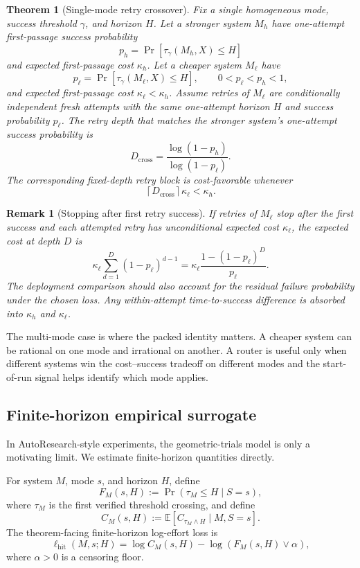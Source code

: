 \documentclass{article}
\newtheorem{theorem}{Theorem}
\newtheorem{remark}{Remark}
\newcommand{\E}{\mathbb{E}}
\begin{document}
\begin{theorem}[Single-mode retry crossover]
\label{thm:crossover}
Fix a single homogeneous mode, success threshold \(\gamma\), and horizon \(H\).
Let a stronger system \(M_h\) have one-attempt first-passage success probability
\[
    p_h=\Pr[\tau_\gamma(M_h,X)\le H]
\]
and expected first-passage cost \(\kappa_h\).  Let a cheaper system \(M_\ell\) have
\[
    p_\ell=\Pr[\tau_\gamma(M_\ell,X)\le H],
    \qquad
    0<p_\ell<p_h<1,
\]
and expected first-passage cost \(\kappa_\ell<\kappa_h\).
Assume retries of \(M_\ell\) are conditionally independent fresh attempts with the same
one-attempt horizon \(H\) and success probability \(p_\ell\).  The retry depth that matches
the stronger system's one-attempt success probability is
\[
    D_{\mathrm{cross}}
    =
    \frac{\log(1-p_h)}{\log(1-p_\ell)}.
\]
The corresponding fixed-depth retry block is cost-favorable whenever
\[
    \left\lceil D_{\mathrm{cross}}\right\rceil\kappa_\ell < \kappa_h .
\]
\end{theorem}

\begin{remark}[Stopping after first retry success]
If retries of \(M_\ell\) stop after the first success and each attempted retry has
unconditional expected cost \(\kappa_\ell\), the expected cost at depth \(D\) is
\[
    \kappa_\ell
    \sum_{d=1}^{D}(1-p_\ell)^{d-1}
    =
    \kappa_\ell\frac{1-(1-p_\ell)^D}{p_\ell}.
\]
The deployment comparison should also account for the residual failure probability under
the chosen loss.  Any within-attempt time-to-success difference is absorbed into
\(\kappa_h\) and \(\kappa_\ell\).
\end{remark}

The multi-mode case is where the packed identity matters.  A cheaper system can be
rational on one mode and irrational on another.  A router is useful only when different
systems win the cost--success tradeoff on different modes and the start-of-run signal helps
identify which mode applies.



\subsection{Finite-horizon empirical surrogate}

In AutoResearch-style experiments, the geometric-trials model is only a motivating limit.
We estimate finite-horizon quantities directly.

For system \(M\), mode \(s\), and horizon \(H\), define
\[
    F_M(s,H):=\Pr(\tau_M\le H\mid S=s),
\]
where \(\tau_M\) is the first verified threshold crossing, and define
\[
    C_M(s,H):=\E[C_{\tau_M\wedge H}\mid M,S=s].
\]
The theorem-facing finite-horizon log-effort loss is
\[
    \ell_{\mathrm{hit}}(M,s;H)
    =
    \log C_M(s,H)-\log(F_M(s,H)\vee\alpha),
\]
where \(\alpha>0\) is a censoring floor.
\end{document}
